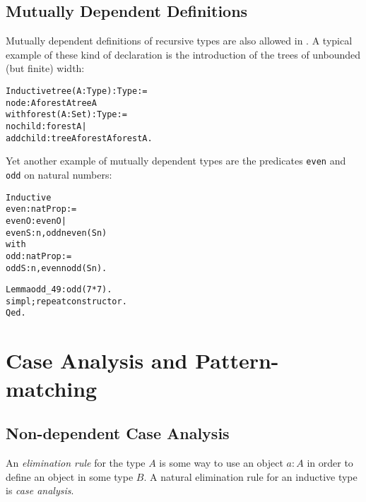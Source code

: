 \documentclass[11pt]{article}
\begin{document}


\subsection{Mutually Dependent Definitions}
\label{MutuallyDependent}

Mutually dependent definitions of recursive types are also allowed in
{\coq}.  A typical example of these kind of declaration is the
introduction of the trees of unbounded (but finite) width:
\label{Forest}
\begin{alltt}
Inductive tree(A:Type)   : Type :=
    node : A {\arrow} forest A \arrow{} tree A
with  forest (A: Set)   : Type :=
    nochild  : forest A |
    addchild : tree A \arrow{} forest A \arrow{} forest A.
\end{alltt}
\noindent  Yet another example of mutually dependent types are the
predicates \texttt{even} and \texttt{odd} on natural numbers:
\label{Even}
\begin{alltt}
Inductive
  even    : nat\arrow{}Prop :=
    evenO : even  O |
    evenS : {\prodsym} n, odd n \arrow{} even (S n)
with
  odd    : nat\arrow{}Prop :=
    oddS : {\prodsym} n, even n \arrow{} odd (S n).
\end{alltt}

\begin{alltt}
Lemma odd_49 : odd (7 * 7).
 simpl; repeat constructor.
Qed.
\end{alltt}



\section{Case Analysis and Pattern-matching}
\label{CaseAnalysis}
\subsection{Non-dependent Case Analysis}
An \textsl{elimination rule} for the type $A$ is some way to use an
object $a:A$ in order to define an object in some  type $B$.
A natural elimination rule for an inductive type is \emph{case analysis}.
\end{document}
